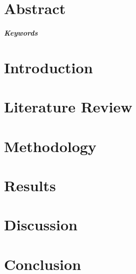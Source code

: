 \documentclass{senior-design}
\begin{document}
\frontmatter
\individualreportcover  %

\chapter{Abstract}

\paragraph{Keywords}

\tableofcontents
\mainmatter

\chapter{Introduction}
\chapter{Literature Review}
\chapter{Methodology}
\chapter{Results}
\chapter{Discussion}
\chapter{Conclusion}
\end{document}
